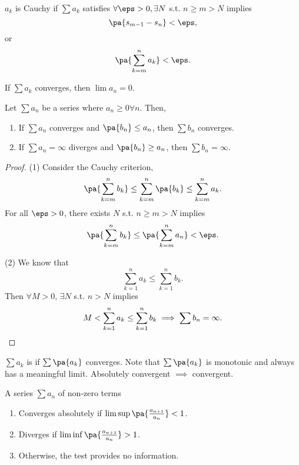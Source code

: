 \documentclass[11pt]{scrartcl}
\numberwithin{equation}{section}
\begin{document}
\begin{proposition}
    $a_k$ is Cauchy if
    $\sum a_k$ satisfies $\forall \eps>0, \exists N$ s.t.
    $n \geq m>N$ implies \[ \pa{s_{m-1}-s_n} < 
    \eps,\]
    or 
    \[
        \pa{\sum_{k=m}^{n}a_k} < \eps. 
    \]
\end{proposition}

\begin{corollary}
    If $\sum a_k$ converges, then $\lim a_n=0$.
\end{corollary}

\begin{proposition}
    \label{prop:comptest}
    Let $\sum a_n$ be a series where $a_n\geq 0\forall n$. Then, 
    \begin{enumerate}
        \item If $\sum a_n$ converges  and $\pa{b_n}\leq a_n$, then 
        $\sum b_n$ converges.
        \item If $\sum a_n=\infty$ diverges and $\pa{b_n}\geq a_n$, then 
        $\sum b_n = \infty$.
    \end{enumerate}
\end{proposition}
\begin{proof}
    (1) Consider the Cauchy criterion,
    \[ \pa{\sum_{k=m}^{n}b_k} \leq \sum_{k=m}^{n}\pa{b_k} 
    \leq \sum_{k=m}^{n}a_k.\]
    For all $\eps>0$, there exists $N$ s.t. $n\geq m > N$ implies 
    \[ \pa{\sum_{k=m}^{n}b_k} \leq \pa{\sum_{k=m}^{n}a_n}< \eps.\]

    (2) We know that 
    \[ \sum_{k=1}^{n}a_k \leq \sum_{k=1}^{n}b_k.\]
    Then $\forall M>0$, $\exists N$ s.t. $n>N$ implies
    \[ M < \sum_{k=1}^{n} a_k \leq \sum_{k=1}^{n} b_k  \implies \sum b_n = \infty.
    \qedhere \]
\end{proof}
\begin{definition}
    $\sum a_k$ is  if $\sum \pa{a_k}$ converges.
    Note that $\sum \pa{a_k}$ is monotonic and always has a meaningful
    limit. Absolutely convergent $\implies$ convergent.
\end{definition}
\begin{proposition}
    \label{prop:ratiotest}
    A series $\sum a_n$ of non-zero terms 
    \begin{enumerate}
        \item Converges absolutely if $\limsup \pa{\frac{a_{n+1}}{{a_n}}} < 1$.
        \item Diverges if $\liminf \pa{\frac{a_{n+1}}{{a_n}}} > 1$.
        \item Otherwise, the test provides no information.
    \end{enumerate}
\end{proposition}
\end{document}
